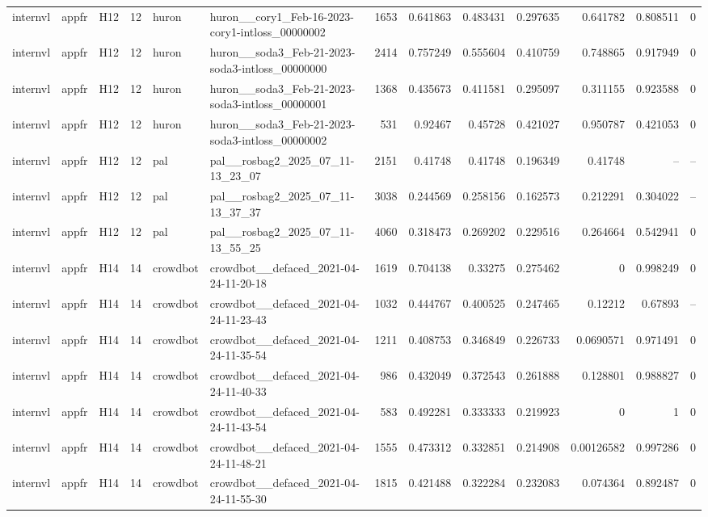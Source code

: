 \begin{longtable}{lllrllrrrrrrr}
internvl & appfr & H12 & 12 & huron & huron\_\_cory1\_Feb-16-2023-cory1-intloss\_00000002 & 1653 & 0.641863 & 0.483431 & 0.297635 & 0.641782 & 0.808511 & 0 \\
internvl & appfr & H12 & 12 & huron & huron\_\_soda3\_Feb-21-2023-soda3-intloss\_00000000 & 2414 & 0.757249 & 0.555604 & 0.410759 & 0.748865 & 0.917949 & 0 \\
internvl & appfr & H12 & 12 & huron & huron\_\_soda3\_Feb-21-2023-soda3-intloss\_00000001 & 1368 & 0.435673 & 0.411581 & 0.295097 & 0.311155 & 0.923588 & 0 \\
internvl & appfr & H12 & 12 & huron & huron\_\_soda3\_Feb-21-2023-soda3-intloss\_00000002 & 531 & 0.92467 & 0.45728 & 0.421027 & 0.950787 & 0.421053 & 0 \\
internvl & appfr & H12 & 12 & pal & pal\_\_rosbag2\_2025\_07\_11-13\_23\_07 & 2151 & 0.41748 & 0.41748 & 0.196349 & 0.41748 & -- & -- \\
internvl & appfr & H12 & 12 & pal & pal\_\_rosbag2\_2025\_07\_11-13\_37\_37 & 3038 & 0.244569 & 0.258156 & 0.162573 & 0.212291 & 0.304022 & -- \\
internvl & appfr & H12 & 12 & pal & pal\_\_rosbag2\_2025\_07\_11-13\_55\_25 & 4060 & 0.318473 & 0.269202 & 0.229516 & 0.264664 & 0.542941 & 0 \\
internvl & appfr & H14 & 14 & crowdbot & crowdbot\_\_defaced\_2021-04-24-11-20-18 & 1619 & 0.704138 & 0.33275 & 0.275462 & 0 & 0.998249 & 0 \\
internvl & appfr & H14 & 14 & crowdbot & crowdbot\_\_defaced\_2021-04-24-11-23-43 & 1032 & 0.444767 & 0.400525 & 0.247465 & 0.12212 & 0.67893 & -- \\
internvl & appfr & H14 & 14 & crowdbot & crowdbot\_\_defaced\_2021-04-24-11-35-54 & 1211 & 0.408753 & 0.346849 & 0.226733 & 0.0690571 & 0.971491 & 0 \\
internvl & appfr & H14 & 14 & crowdbot & crowdbot\_\_defaced\_2021-04-24-11-40-33 & 986 & 0.432049 & 0.372543 & 0.261888 & 0.128801 & 0.988827 & 0 \\
internvl & appfr & H14 & 14 & crowdbot & crowdbot\_\_defaced\_2021-04-24-11-43-54 & 583 & 0.492281 & 0.333333 & 0.219923 & 0 & 1 & 0 \\
internvl & appfr & H14 & 14 & crowdbot & crowdbot\_\_defaced\_2021-04-24-11-48-21 & 1555 & 0.473312 & 0.332851 & 0.214908 & 0.00126582 & 0.997286 & 0 \\
internvl & appfr & H14 & 14 & crowdbot & crowdbot\_\_defaced\_2021-04-24-11-55-30 & 1815 & 0.421488 & 0.322284 & 0.232083 & 0.074364 & 0.892487 & 0 \\

\end{longtable}
